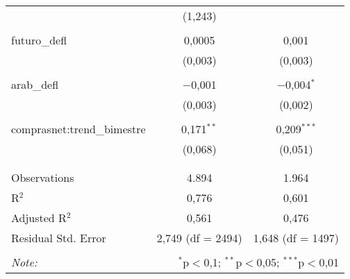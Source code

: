 \begin{table}[!htbp]
\begin{tabular}{@{\extracolsep{5pt}}lcc}
  & (1,243) &  \\ 
  & & \\ 
 futuro\_defl & 0,0005 & 0,001 \\ 
  & (0,003) & (0,003) \\ 
  & & \\ 
 arab\_defl & $-$0,001 & $-$0,004$^{*}$ \\ 
  & (0,003) & (0,002) \\ 
  & & \\ 
 comprasnet:trend\_bimestre & 0,171$^{**}$ & 0,209$^{***}$ \\ 
  & (0,068) & (0,051) \\ 
  & & \\ 
\hline \\[-1.8ex] 
Observations & 4.894 & 1.964 \\ 
R$^{2}$ & 0,776 & 0,601 \\ 
Adjusted R$^{2}$ & 0,561 & 0,476 \\ 
Residual Std. Error & 2,749 (df = 2494) & 1,648 (df = 1497) \\ 
\hline 
\hline \\[-1.8ex] 
\textit{Note:}  & \multicolumn{2}{r}{$^{*}$p$<$0,1; $^{**}$p$<$0,05; $^{***}$p$<$0,01} \\ 
\end{tabular} 
\end{table} 
